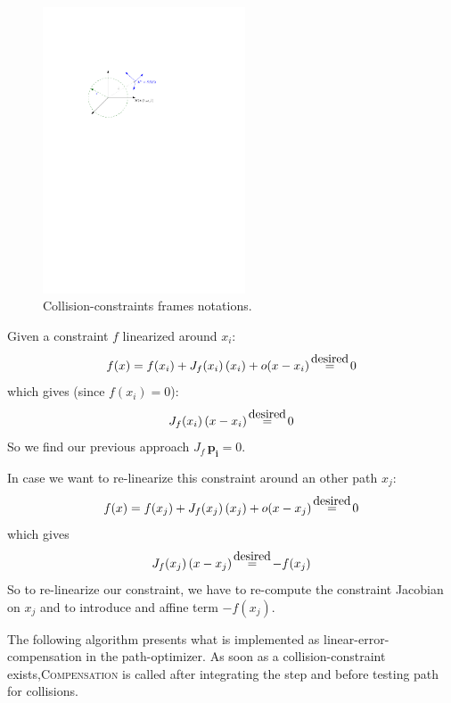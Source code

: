\documentclass {article}
\newcommand\p{\mathbf{p_i}}
\newcommand\myeq{\stackrel{\mathclap{\normalfont\mbox{desired}}}{=}}
\begin{document}
\begin{figure}[h]
	\centering
	\includegraphics[width=6cm]{framesConstraintError.pdf}
	\caption{Collision-constraints frames notations.}
	\label{fig:framesConstraintError}
\end{figure}

\vspace{0.2cm}

Given a constraint $f$ linearized around $x_i$:
$$ f(x) = f(x_i) + J_f(x_i)\,(x_i) + o(x-x_i) \ \ \ \myeq  \ \ \ 0 $$
which gives (since $f(x_i)=0$):
$$ J_f(x_i)\,(x-x_i) \ \ \ \myeq  \ \ \ 0 $$
So we find our previous approach $ J_f\,\p = 0$.

\vspace{0.2cm}

In case we want to re-linearize this constraint around an other path $x_j$:
$$ f(x) = f(x_j) + J_f(x_j)\,(x_j) + o(x-x_j) \ \ \ \myeq  \ \ \ 0 $$
which gives
$$ J_f(x_j)\,(x-x_j) \ \ \ \myeq  \ \ \ -f(x_j) $$
So to re-linearize our constraint, we have to re-compute the constraint Jacobian on $x_j$ and to introduce and affine term $-f(x_j)$.


\vspace{0.2cm}

The following algorithm presents what is implemented as linear-error-compensation in the path-optimizer. As soon as a collision-constraint exists,\textsc{Compensation} is called after integrating the step and before testing path for collisions.
\end{document}

